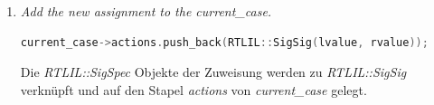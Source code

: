 \documentclass[11pt]{report}
\begin{document}
\begin{enumerate}

\item \textit{Add the new assignment to the current\_case.
}
\begin{lstlisting}[language=C++]
current_case->actions.push_back(RTLIL::SigSig(lvalue, rvalue));
\end{lstlisting}
Die \textit{RTLIL::SigSpec} Objekte der Zuweisung werden zu \textit{RTLIL::SigSig} verknüpft und auf den Stapel \textit{actions} von \textit{current\_case} gelegt.

\end{enumerate}
\end{document}
